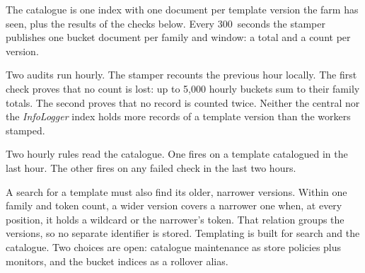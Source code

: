 The catalogue is one index with one document per template version the farm has seen, plus the results of the checks below. Every 300~seconds the stamper publishes one bucket document per family and window: a total and a count per version.

Two audits run hourly. The stamper recounts the previous hour locally. The first check proves that no count is lost: up to 5,000 hourly buckets sum to their family totals. The second proves that no record is counted twice. Neither the central nor the \textit{InfoLogger} index holds more records of a template version than the workers stamped.

Two hourly rules read the catalogue. One fires on a template catalogued in the last hour. The other fires on any failed check in the last two hours.

A search for a template must also find its older, narrower versions. Within one family and token count, a wider version covers a narrower one when, at every position, it holds a wildcard or the narrower's token. That relation groups the versions, so no separate identifier is stored. Templating is built for search and the catalogue. Two choices are open: catalogue maintenance as store policies plus monitors, and the bucket indices as a rollover alias.
